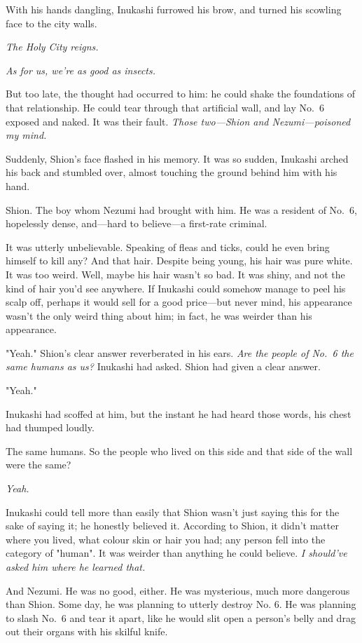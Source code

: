 With his hands dangling, Inukashi furrowed his brow, and turned his
scowling face to the city walls.

\emph{The Holy City reigns.}

\emph{As for us, we're as good as insects.}

But too late, the thought had occurred to him: he could shake the
foundations of that relationship. He could tear through that artificial
wall, and lay No.~6 exposed and naked. It was their fault. \emph{Those
two---Shion and Nezumi---poisoned my mind.}

Suddenly, Shion's face flashed in his memory. It was so sudden, Inukashi
arched his back and stumbled over, almost touching the ground behind him
with his hand.

Shion. The boy whom Nezumi had brought with him. He was a resident of
No.~6, hopelessly dense, and---hard to believe---a first-rate criminal.

It was utterly unbelievable. Speaking of fleas and ticks, could he even
bring himself to kill any? And that hair. Despite being young, his hair
was pure white. It was too weird. Well, maybe his hair wasn't so bad. It
was shiny, and not the kind of hair you'd see anywhere. If Inukashi
could somehow manage to peel his scalp off, perhaps it would sell for a
good price---but never mind, his appearance wasn't the only weird thing
about him; in fact, he was weirder than his appearance.

"Yeah." Shion's clear answer reverberated in his ears. \emph{Are the people of
No.~6 the same humans as us?} Inukashi had asked. Shion had given a clear
answer.

"Yeah."

Inukashi had scoffed at him, but the instant he had heard those words,
his chest had thumped loudly.

The same humans. So the people who lived on this side and that side of
the wall were the same?

\emph{Yeah.}

Inukashi could tell more than easily that Shion wasn't just saying this
for the sake of saying it; he honestly believed it. According to Shion,
it didn't matter where you lived, what colour skin or hair you had; any
person fell into the category of "human". It was weirder than anything
he could believe. \emph{I should've asked him where he learned that.}

And Nezumi. He was no good, either. He was mysterious, much more
dangerous than Shion. Some day, he was planning to utterly destroy No.
6. He was planning to slash No.~6 and tear it apart, like he would slit
open a person's belly and drag out their organs with his skilful knife.

